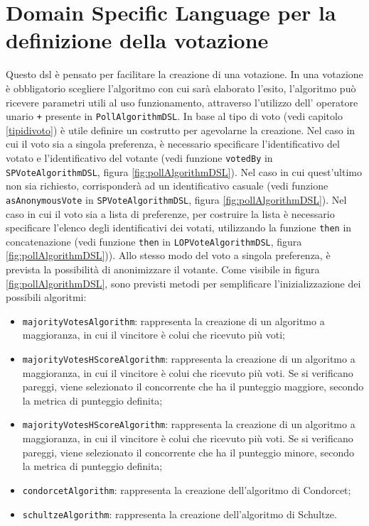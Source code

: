 \documentclass[12pt,a4paper,openright,twoside]{book}
\begin{document}
 \section{Domain Specific Language per la definizione della votazione}
 Questo \ac{dsl} è pensato per facilitare la creazione di una votazione.
 In una votazione è obbligatorio scegliere l'algoritmo con cui sarà elaborato l'esito, 
 l'algoritmo può ricevere parametri utili al uso funzionamento, attraverso l'utilizzo dell'
 operatore unario \texttt{+} presente in \texttt{PollAlgorithmDSL}.
 In base al tipo di voto (vedi capitolo \ref{tipidivoto}) è utile definire un costrutto
 per agevolarne la creazione.
 Nel caso in cui il voto sia a singola preferenza, è necessario specificare
 l'identificativo del votato e l'identificativo del votante (vedi funzione \texttt{votedBy} in \texttt{SPVoteAlgorithmDSL}, figura \ref{fig:pollAlgorithmDSL}). Nel caso in cui quest'ultimo non 
 sia richiesto, corrisponderà ad un identificativo casuale (vedi funzione \texttt{asAnonymousVote} in \texttt{SPVoteAlgorithmDSL}, figura \ref{fig:pollAlgorithmDSL}).
 Nel caso in cui il voto sia a lista di preferenze, per costruire la lista è necessario specificare l'elenco degli identificativi dei votati,
 utilizzando la funzione \texttt{then} in concatenazione (vedi funzione \texttt{then} in \texttt{LOPVoteAlgorithmDSL}, figura \ref{fig:pollAlgorithmDSL})).
 Allo stesso modo del voto a singola preferenza, è prevista la possibilità di anonimizzare il votante.
 Come visibile in figura \ref{fig:pollAlgorithmDSL}, sono previsti metodi per semplificare l'inizializzazione dei possibili algoritmi:
 \begin{itemize}
    \item{\texttt{majorityVotesAlgorithm}: rappresenta la creazione di un algoritmo a maggioranza, in cui il vincitore è colui che ricevuto più voti;}
    \item{\texttt{majorityVotesHScoreAlgorithm}: rappresenta la creazione di un algoritmo a maggioranza, in cui il vincitore è colui che ricevuto più voti.
    Se si verificano pareggi, viene selezionato il concorrente che ha il punteggio maggiore, secondo la metrica di punteggio definita;}
    \item{\texttt{majorityVotesHScoreAlgorithm}: rappresenta la creazione di un algoritmo a maggioranza, in cui il vincitore è colui che ricevuto più voti.
    Se si verificano pareggi, viene selezionato il concorrente che ha il punteggio minore, secondo la metrica di punteggio definita;}
    \item{\texttt{condorcetAlgorithm}: rappresenta la creazione dell'algoritmo di Condorcet;}
    \item{\texttt{schultzeAlgorithm}: rappresenta la creazione dell'algoritmo di Schultze.}
 \end{itemize}
\end{document}
